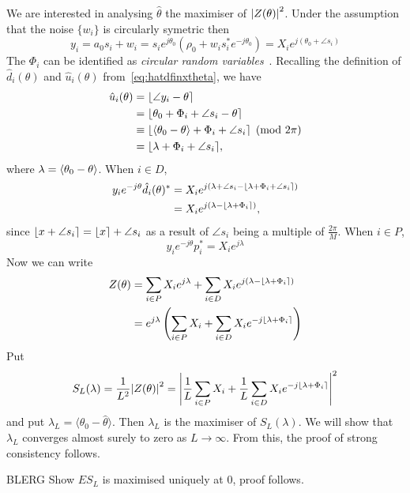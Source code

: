 \documentclass[journal]{IEEEtran}
\begin{document}
We are interested in analysing $\hat{\theta}$ the maximiser of ${\left| Z(\theta) \right|}^2$.
Under the assumption that the noise $\{w_i\}$ is circularly symetric then
\[
y_i = a_0 s_i + w_i = s_i e^{j \theta_0}( \rho_0 + w_i s_i^* e^{-j \theta_0}) = X_i e^{j ( \theta_0 + \angle{s_i}) }
\] 
The $\Phi_i$ can be identified as \emph{circular random variables}~\cite{Mardia_directional_statistics,Fisher1993,McKilliam_mean_dir_est_sq_arc_length2010}.  Recalling the definition of $\hat{d}_i(\theta)$ and $\hat{u}_i(\theta)$ from~\eqref{eq:hatdfinxtheta}, we have
\begin{align*}
\hat{u}_i(\theta) &= {\left\lfloor \angle{y_i} - \theta \right\rceil} \\
&= {\left\lfloor \theta_0 + \Phi_i + \angle{s_i} - \theta \right\rceil} \\
&\equiv {\left\lfloor  \left\langle \theta_0 - \theta \right\rangle + \Phi_i + \angle{s_i} \right\rceil} \pmod{2\pi} \\
&= {\left\lfloor  \lambda + \Phi_i + \angle{s_i}  \right\rceil},
\end{align*}
where $\lambda = \left\langle \theta_0 - \theta \right\rangle$.  When $i \in D$,
\begin{align*}
 y_i e^{-j\theta} \hat{d}_i(\theta)^* &= X_i e^{j(\lambda + \angle{s_i} - {\left\lfloor \lambda + \Phi_i + \angle{s_i} \right\rceil})} \\
&= X_i e^{j(\lambda - {\left\lfloor \lambda + \Phi_i \right\rceil})},
\end{align*}
since ${\left\lfloor x + \angle{s_i} \right\rceil} = {\left\lfloor x \right\rceil} + \angle{s_i}$ as a result of $\angle{s_i}$ being a multiple of $\tfrac{2\pi}{M}$.  When $i \in P$,  
\[
y_i e^{-j\theta} p_i^* = X_i e^{j\lambda}
\]
Now we can write
\begin{align*}
Z(\theta) &= \sum_{i \in P} X_i e^{j\lambda} + \sum_{i \in D} X_i e^{j(\lambda - {\left\lfloor \lambda + \Phi_i \right\rceil})} \\
&= e^{j\lambda} \left( \sum_{i \in P} X_i + \sum_{i \in D} X_i e^{-j{\left\lfloor \lambda + \Phi_i \right\rceil}} \right)
\end{align*}
Put 
\[
S_L(\lambda) = \frac{1}{L^2}{\left| Z(\theta) \right|}^2 = {\left| \frac{1}{L}\sum_{i \in P} X_i + \frac{1}{L}\sum_{i \in D} X_i e^{-j{\left\lfloor \lambda + \Phi_i \right\rceil}} \right|}^2
\] 
and put $\lambda_L = \langle\theta_0 - \hat{\theta}\rangle$.  Then $\lambda_L$ is the maximiser of $S_L(\lambda)$.  We will show that $\lambda_L$ converges almost surely to zero as $L \rightarrow \infty$.  From this, the proof of strong consistency follows.

BLERG  Show $E S_L$ is maximised uniquely at 0, proof follows.
\end{document}

